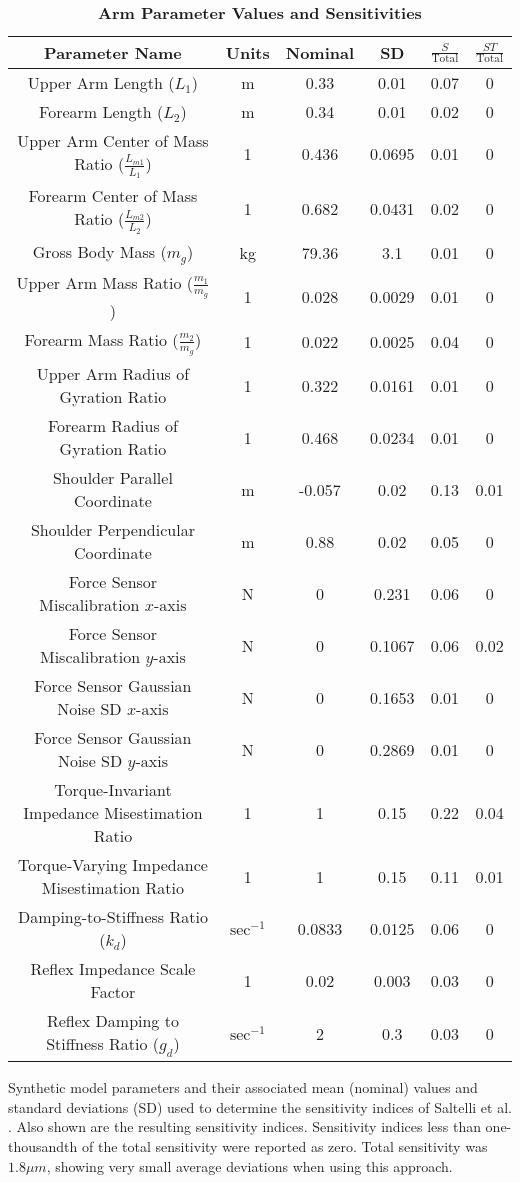 \documentclass[10pt]{article}
\begin{document}
\begin{table}[!ht]
\caption{
\bf{Arm Parameter Values and Sensitivities}}
\begin{tabular}{|c|c|c c|c c|}
\hline
Parameter Name &
Units &
Nominal &
SD &
$\frac{S}{\text{Total}}$ &
$\frac{ST}{\text{Total}}$ \\ \hline
Upper Arm Length ($L_1$) &
m &
0.33 &
0.01 &
0.07 &
0 \\
Forearm Length ($L_2$) &
m &
0.34 &
0.01 &
0.02 &
0 \\
Upper Arm Center of Mass Ratio ($\frac{L_{m1}}{L_1}$) &
1 &
0.436 &
0.0695 &
0.01 &
0 \\
Forearm Center of Mass Ratio ($\frac{L_{m2}}{L_2}$) &
1 &
0.682 &
0.0431 &
0.02 &
0 \\
Gross Body Mass ($m_g$) &
kg &
79.36 &
3.1 &
0.01 &
0 \\
Upper Arm Mass Ratio ($\frac{m_1}{m_g}$) &
1 &
0.028 &
0.0029 &
0.01 &
0 \\
Forearm Mass Ratio ($\frac{m_2}{m_g}$) &
1 &
0.022 &
0.0025 &
0.04 &
0 \\
Upper Arm Radius of Gyration Ratio &
1 &
0.322 &
0.0161 &
0.01 &
0 \\
Forearm Radius of Gyration Ratio &
1 &
0.468 &
0.0234 &
0.01 &
0 \\
Shoulder Parallel Coordinate &
m &
-0.057 &
0.02 &
0.13 &
0.01 \\
Shoulder Perpendicular Coordinate &
m &
0.88 &
0.02 &
0.05 &
0 \\
Force Sensor Miscalibration $x\text{-axis}$ &
N &
0 &
0.231 &
0.06 &
0 \\
Force Sensor Miscalibration $y\text{-axis}$ &
N &
0 &
0.1067 &
0.06 &
0.02 \\
Force Sensor Gaussian Noise SD $x\text{-axis}$ &
N &
0 &
0.1653 &
0.01 &
0 \\
Force Sensor Gaussian Noise SD $y\text{-axis}$ &
N &
0 &
0.2869 &
0.01 &
0 \\
Torque-Invariant Impedance Misestimation Ratio &
1 &
1 &
0.15 &
0.22 &
0.04 \\
Torque-Varying Impedance Misestimation Ratio &
1 &
1 &
0.15 &
0.11 &
0.01 \\
Damping-to-Stiffness Ratio ($k_d$) &
$\text{sec}^{-1}$ &
0.0833 &
0.0125 &
0.06 &
0 \\
Reflex Impedance Scale Factor &
1 &
0.02 &
0.003 &
0.03 &
0 \\
Reflex Damping to Stiffness Ratio ($g_d$) &
$\text{sec}^{-1}$ &
2 &
0.3 &
0.03 &
0 \\ \hline
\end{tabular}
\begin{flushleft}Synthetic model parameters and their associated mean (nominal) values and standard deviations (SD) used to determine the sensitivity indices of Saltelli et al. \cite{saltelli2010variance}. Also shown are the resulting sensitivity indices. Sensitivity indices less than one-thousandth of the total sensitivity were reported as zero. Total sensitivity was $1.8 \mu m$, showing very small average deviations when using this approach.
\end{flushleft}
\label{tab:parameters}
\end{table}
\end{document}
